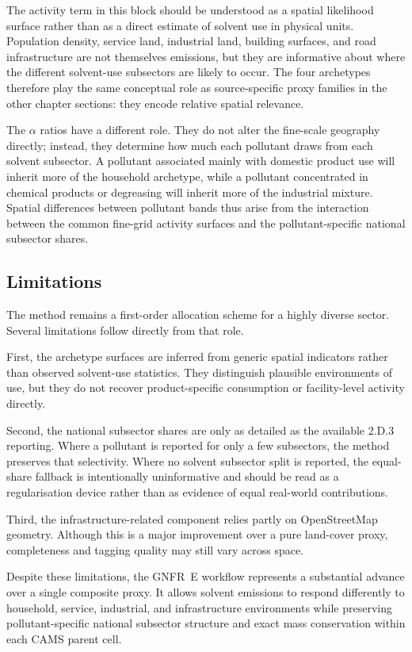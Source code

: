 The activity term in this block should be understood as a spatial
likelihood surface rather than as a direct estimate of solvent use in
physical units. Population density, service land, industrial land,
building surfaces, and road infrastructure are not themselves emissions,
but they are informative about where the different solvent-use
subsectors are likely to occur. The four archetypes therefore play the
same conceptual role as source-specific proxy families in the other
chapter sections: they encode relative spatial relevance.

The $\alpha$ ratios have a different role. They do not alter the
fine-scale geography directly; instead, they determine how much each
pollutant draws from each solvent subsector. A pollutant associated
mainly with domestic product use will inherit more of the household
archetype, while a pollutant concentrated in chemical products or
degreasing will inherit more of the industrial mixture. Spatial
differences between pollutant bands thus arise from the interaction
between the common fine-grid activity surfaces and the
pollutant-specific national subsector shares.

\subsection{Limitations}

The method remains a first-order allocation scheme for a highly diverse
sector. Several limitations follow directly from that role.

First, the archetype surfaces are inferred from generic spatial
indicators rather than observed solvent-use statistics. They distinguish
plausible environments of use, but they do not recover product-specific
consumption or facility-level activity directly.

Second, the national subsector shares are only as detailed as the
available 2.D.3 reporting. Where a pollutant is reported for only a few
subsectors, the method preserves that selectivity. Where no solvent
subsector split is reported, the equal-share fallback is intentionally
uninformative and should be read as a regularisation device rather than
as evidence of equal real-world contributions.

Third, the infrastructure-related component relies partly on
OpenStreetMap geometry. Although this is a major improvement over a pure
land-cover proxy, completeness and tagging quality may still vary across
space.

Despite these limitations, the GNFR~E workflow represents a substantial
advance over a single composite proxy. It allows solvent emissions to
respond differently to household, service, industrial, and
infrastructure environments while preserving pollutant-specific national
subsector structure and exact mass conservation within each CAMS parent
cell.
